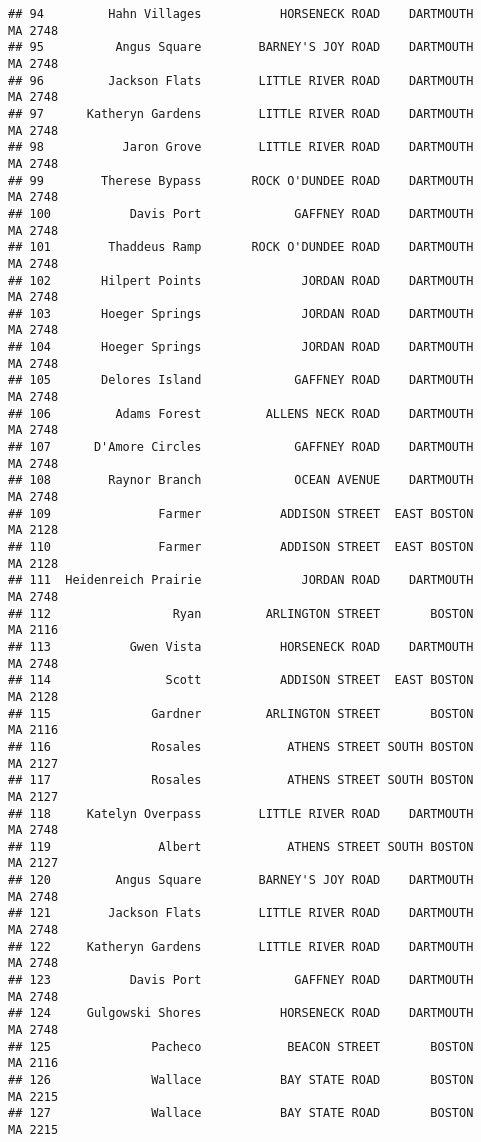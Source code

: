 \documentclass[
]{article}
\begin{document}
\begin{verbatim}
## 94         Hahn Villages           HORSENECK ROAD    DARTMOUTH    MA 2748
## 95          Angus Square        BARNEY'S JOY ROAD    DARTMOUTH    MA 2748
## 96         Jackson Flats        LITTLE RIVER ROAD    DARTMOUTH    MA 2748
## 97      Katheryn Gardens        LITTLE RIVER ROAD    DARTMOUTH    MA 2748
## 98           Jaron Grove        LITTLE RIVER ROAD    DARTMOUTH    MA 2748
## 99        Therese Bypass       ROCK O'DUNDEE ROAD    DARTMOUTH    MA 2748
## 100           Davis Port             GAFFNEY ROAD    DARTMOUTH    MA 2748
## 101        Thaddeus Ramp       ROCK O'DUNDEE ROAD    DARTMOUTH    MA 2748
## 102       Hilpert Points              JORDAN ROAD    DARTMOUTH    MA 2748
## 103       Hoeger Springs              JORDAN ROAD    DARTMOUTH    MA 2748
## 104       Hoeger Springs              JORDAN ROAD    DARTMOUTH    MA 2748
## 105       Delores Island             GAFFNEY ROAD    DARTMOUTH    MA 2748
## 106         Adams Forest         ALLENS NECK ROAD    DARTMOUTH    MA 2748
## 107      D'Amore Circles             GAFFNEY ROAD    DARTMOUTH    MA 2748
## 108        Raynor Branch             OCEAN AVENUE    DARTMOUTH    MA 2748
## 109               Farmer           ADDISON STREET  EAST BOSTON    MA 2128
## 110               Farmer           ADDISON STREET  EAST BOSTON    MA 2128
## 111  Heidenreich Prairie              JORDAN ROAD    DARTMOUTH    MA 2748
## 112                 Ryan         ARLINGTON STREET       BOSTON    MA 2116
## 113           Gwen Vista           HORSENECK ROAD    DARTMOUTH    MA 2748
## 114                Scott           ADDISON STREET  EAST BOSTON    MA 2128
## 115              Gardner         ARLINGTON STREET       BOSTON    MA 2116
## 116              Rosales            ATHENS STREET SOUTH BOSTON    MA 2127
## 117              Rosales            ATHENS STREET SOUTH BOSTON    MA 2127
## 118     Katelyn Overpass        LITTLE RIVER ROAD    DARTMOUTH    MA 2748
## 119               Albert            ATHENS STREET SOUTH BOSTON    MA 2127
## 120         Angus Square        BARNEY'S JOY ROAD    DARTMOUTH    MA 2748
## 121        Jackson Flats        LITTLE RIVER ROAD    DARTMOUTH    MA 2748
## 122     Katheryn Gardens        LITTLE RIVER ROAD    DARTMOUTH    MA 2748
## 123           Davis Port             GAFFNEY ROAD    DARTMOUTH    MA 2748
## 124     Gulgowski Shores           HORSENECK ROAD    DARTMOUTH    MA 2748
## 125              Pacheco            BEACON STREET       BOSTON    MA 2116
## 126              Wallace           BAY STATE ROAD       BOSTON    MA 2215
## 127              Wallace           BAY STATE ROAD       BOSTON    MA 2215

\end{verbatim}
\end{document}

